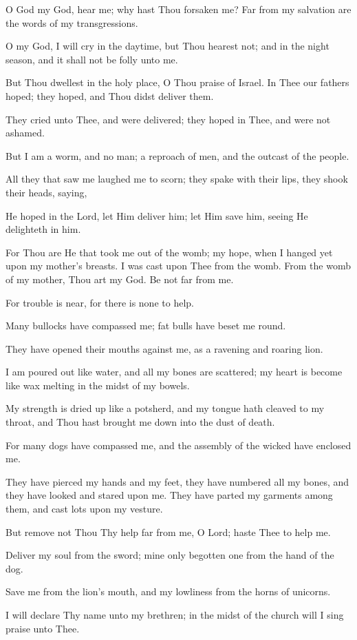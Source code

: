 O God my God, hear me; why hast Thou forsaken me? Far from my salvation are the words of my transgressions.

O my God, I will cry in the daytime, but Thou hearest not; and in the night season, and it shall not be folly unto me.

But Thou dwellest in the holy place, O Thou praise of Israel. In Thee our fathers hoped; they hoped, and Thou didst deliver them.

They cried unto Thee, and were delivered; they hoped in Thee, and were not ashamed.

But I am a worm, and no man; a reproach of men, and the outcast of the people.

All they that saw me laughed me to scorn; they spake with their lips, they shook their heads, saying,

He hoped in the Lord, let Him deliver him; let Him save him, seeing He delighteth in him.

For Thou are He that took me out of the womb; my hope, when I hanged yet upon my mother's breasts. I was cast upon Thee from the womb. From the womb of my mother, Thou art my God. Be not far from me.

For trouble is near, for there is none to help.

Many bullocks have compassed me; fat bulls have beset me round.

They have opened their mouths against me, as a ravening and roaring lion.

I am poured out like water, and all my bones are scattered; my heart is become like wax melting in the midst of my bowels.

My strength is dried up like a potsherd, and my tongue hath cleaved to my throat, and Thou hast brought me down into the dust of death.

For many dogs have compassed me, and the assembly of the wicked have enclosed me.

They have pierced my hands and my feet, they have numbered all my bones, and they have looked and stared upon me. They have parted my garments among them, and cast lots upon my vesture.

But remove not Thou Thy help far from me, O Lord; haste Thee to help me.

Deliver my soul from the sword; mine only begotten one from the hand of the dog.

Save me from the lion's mouth, and my lowliness from the horns of unicorns.

I will declare Thy name unto my brethren; in the midst of the church will I sing praise unto Thee.


